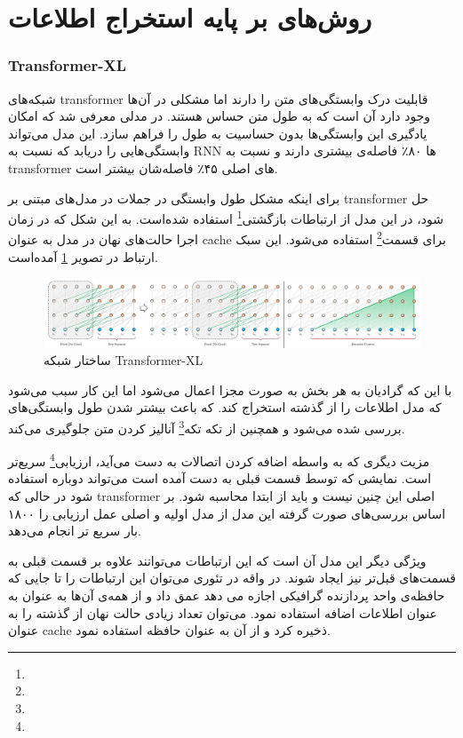 \documentclass[12pt, a4paper, oneside]{report}
\begin{document}
\section{روش‌های بر پایه استخراج اطلاعات}

\subsubsection{Transformer-XL}

شبکه‌های 
transformer
قابلیت درک وابستگی‌های متن را دارند اما مشکلی در آن‌ها وجود دارد آن است که به طول متن حساس هستند.
در
\cite{dai2019transformerxl}
مدلی معرفی شد که امکان یادگیری این وابستگی‌ها بدون حساسیت به طول را فراهم سازد. این مدل می‌تواند وابستگی‌هایی
را دریابد که نسبت به
RNN
ها ۸۰٪  فاصله‌ی بیشتری دارند و نسبت به
transformer
های اصلی ۴۵٪ فاصله‌شان بیشتر است.

برای اینکه مشکل طول وابستگی در جملات در مدل‌های مبتنی بر
transformer
حل شود، در این مدل از ارتباطات بازگشتی\footnote{}
استفاده شده‌است. به این شکل که در زمان اجرا حالت‌های نهان در مدل به عنوان 
cache
برای قسمت\footnote{} 
استفاده می‌شود. این سبک ارتباط در تصویر
\ref{fig:xt}
آمده‌است.

\begin{figure}[!ht]
    \centering
    \includegraphics[width=1\textwidth]{xt}
    \caption{ ساختار شبکه Transformer-XL }
    \label{fig:xt}
\end{figure}

با این که گرادیان به هر بخش به صورت مجزا اعمال می‌شود اما این کار سبب می‌شود که مدل اطلاعات را از
گذشته استخراج کند. که باعث بیشتر شدن طول وابستگی‌های بررسی شده می‌شود و همچنین از 
تکه تکه\footnote{}
آنالیز کردن
متن جلوگیری می‌کند.

مزیت دیگری که به واسطه اضافه کردن اتصالات به دست می‌آید،
ارزیابی\footnote{}
سریع‌تر است. نمایشی که توسط قسمت قبلی به دست آمده است می‌تواند دوباره استفاده شود در حالی که
transformer
اصلی این چنین نیست و باید از ابتدا محاسبه شود. بر اساس بررسی‌های صورت گرفته این مدل از مدل اولیه و اصلی
عمل ارزیابی را ۱۸۰۰ بار سریع تر انجام می‌دهد.

ویژگی دیگر این مدل آن است که این ارتباطات می‌توانند علاوه بر قسمت قبلی به قسمت‌های قبل‌تر نیز ایجاد شوند.
در واقه در تئوری می‌توان این ارتباطات را تا جایی که حافظه‌ی واحد پردازنده گرافیکی اجازه می دهد عمق داد
و از همه‌ی آن‌ها به عنوان به عنوان اطلاعات اضافه استفاده نمود. می‌توان تعداد زیادی حالت نهان از گذشته را به عنوان
cache
ذخیره کرد و از آن به عنوان حافظه استفاده نمود.
\end{document}

